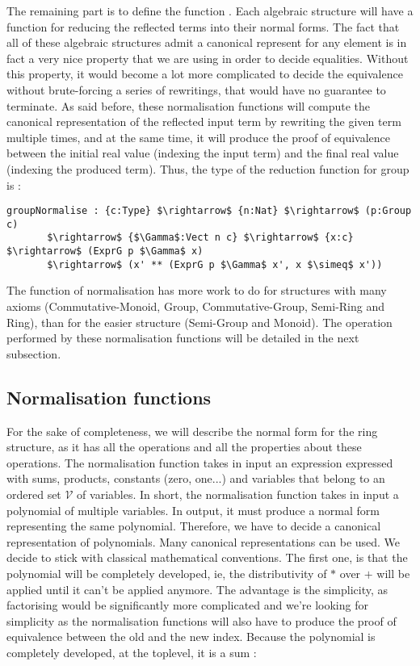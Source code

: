 The remaining part is to define the function . Each algebraic structure will have a function for reducing the reflected terms into their normal forms. The fact that all of these algebraic structures admit a canonical represent for any element is in fact a very nice property that we are using in order to decide equalities. Without this property, it would become a lot more complicated to decide the equivalence without brute-forcing a series of rewritings, that would have no guarantee to terminate.
As said before, these normalisation functions will compute the canonical representation of the reflected input term by rewriting the given term multiple times, and at the same time, it will produce the proof of equivalence between the initial real value (indexing the input term) and the final real value (indexing the produced term). Thus, the type of the reduction function for group is :


\begin{lstlisting}
groupNormalise : {c:Type} $\rightarrow$ {n:Nat} $\rightarrow$ (p:Group c) 	   	   	   
	   $\rightarrow$ {$\Gamma$:Vect n c} $\rightarrow$ {x:c} $\rightarrow$ (ExprG p $\Gamma$ x) 
	   $\rightarrow$ (x' ** (ExprG p $\Gamma$ x', x $\simeq$ x'))
\end{lstlisting}


The function of normalisation has more work to do for structures with many axioms (Commutative-Monoid, Group, Commutative-Group, Semi-Ring and Ring), than for the easier structure (Semi-Group and Monoid).
The operation performed by these normalisation functions will be detailed in the next subsection.


\subsection{Normalisation functions}
\label{sect:normalFormShape}

For the sake of completeness, we will describe the normal form for the ring structure, as it has all the operations and all the properties about these operations.
The normalisation function takes in input an expression expressed with sums, products, constants (zero, one...) and variables that belong to an ordered set $\mathcal{V}$ of variables. In short, the normalisation function takes in input a polynomial of multiple variables. In output, it must produce a normal form representing the same polynomial. Therefore, we have to decide a canonical representation of polynomials. Many canonical representations can be used. We decide to stick with classical mathematical conventions. The first one, is that the polynomial will be completely developed, ie, the distributivity of $*$ over $+$ will be applied until it can't be applied anymore. The advantage is the simplicity, as factorising would be significantly more complicated and we're looking for simplicity as the normalisation functions will also have to produce the proof of equivalence between the old and the new index. Because the polynomial is completely developed, at the toplevel, it is a sum :

